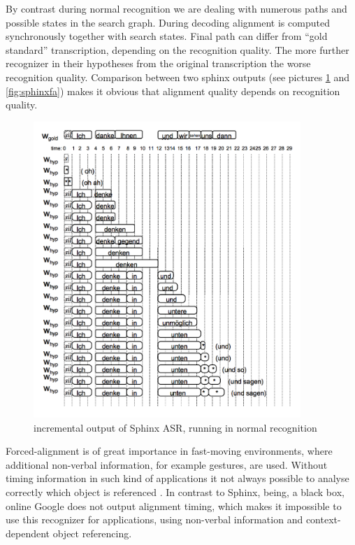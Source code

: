 By contrast during normal recognition we are dealing with numerous paths  and
possible states in the search graph. During decoding alignment
is computed synchronously together with search states. Final path can differ
from ``gold standard'' transcription, depending on the recognition quality. The
more further recognizer in their hypotheses from the original transcription the
worse recognition quality. Comparison between two sphinx outputs
(see pictures \ref {fig:sphinx} and \ref {fig:sphinxfa}) makes it obvious that
alignment quality depends on recognition quality.
\begin{figure}[htbp]  
  \centering
   \includegraphics[width=0.9\textwidth]{images/sphinx_output.png}
  \caption{incremental output of Sphinx ASR, running in normal recognition}
  \label{fig:sphinx}
\end{figure}

Forced-alignment is of great importance in fast-moving environments, where
additional non-verbal information, for example gestures, are used.  Without
timing information in such kind of applications it not always possible to
analyse correctly which object is referenced 
\parencite {Baumann2016}.  In contrast to Sphinx, being, a black box, online
Google does not output alignment timing, which makes it impossible to use this 
recognizer for applications, using non-verbal information and context-dependent
object referencing. 

